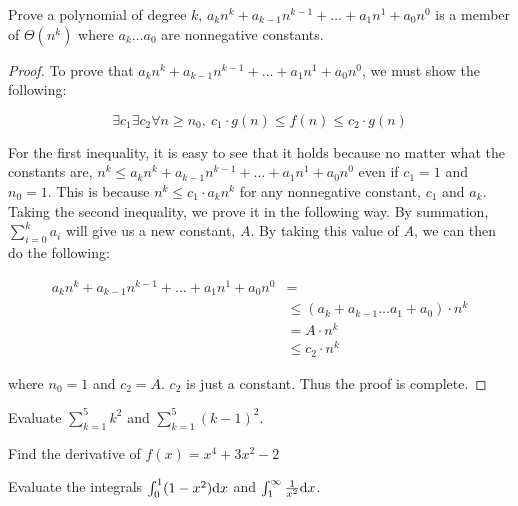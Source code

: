 \documentclass{article}
\begin{document}
\begin{homeworkProblem}
	Prove a polynomial of degree \(k\), \(a_kn^k + a_{k - 1}n^{k - 1} + \hdots
	+ a_1n^1 + a_0n^0\) is a member of \(\Theta(n^k)\) where \(a_k \hdots a_0\)
	are nonnegative constants.
	
	\begin{proof}
		To prove that \(a_kn^k + a_{k - 1}n^{k - 1} + \hdots + a_1n^1 +
		a_0n^0\), we must show the following:
		
		\[
		\exists c_1 \exists c_2 \forall n \geq n_0,\ {c_1 \cdot g(n) \leq
			f(n) \leq c_2 \cdot g(n)}
		\]
		
		For the first inequality, it is easy to see that it holds because no
		matter what the constants are, \(n^k \leq a_kn^k + a_{k - 1}n^{k - 1} +
		\hdots + a_1n^1 + a_0n^0\) even if \(c_1 = 1\) and \(n_0 = 1\).  This
		is because \(n^k \leq c_1 \cdot a_kn^k\) for any nonnegative constant,
		\(c_1\) and \(a_k\).
		\\
		
		Taking the second inequality, we prove it in the following way.
		By summation, \(\sum\limits_{i=0}^k a_i\) will give us a new constant,
		\(A\). By taking this value of \(A\), we can then do the following:
		
		\[
		\begin{split}
		a_kn^k + a_{k - 1}n^{k - 1} + \hdots + a_1n^1 + a_0n^0 &=
		\\
		&\leq (a_k + a_{k - 1} \hdots a_1 + a_0) \cdot n^k
		\\
		&= A \cdot n^k
		\\
		&\leq c_2 \cdot n^k
		\end{split}
		\]
		
		where \(n_0 = 1\) and \(c_2 = A\). \(c_2\) is just a constant. Thus the
		proof is complete.
	\end{proof}
\end{homeworkProblem}

\pagebreak

%
%

\begin{homeworkProblem}[18]
	Evaluate \(\sum_{k=1}^{5} k^2\) and \(\sum_{k=1}^{5} (k - 1)^2\).
\end{homeworkProblem}

\begin{homeworkProblem}
	Find the derivative of \(f(x) = x^4 + 3x^2 - 2\)
\end{homeworkProblem}

\begin{homeworkProblem}[6]
	Evaluate the integrals
	\(\int_0^1 (1 - x^2) \mathrm{d}x\)
	and
	\(\int_1^{\infty} \frac{1}{x^2} \mathrm{d}x\).
\end{homeworkProblem}
\end{document}

